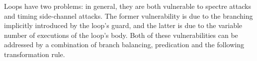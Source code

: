 Loops have two problems: in general, they are both vulnerable to spectre attacks and timing side-channel attacks. The former vulnerability is due to the branching implicitly introduced by the loop's guard, and the latter is due to the variable number of executions of the loop's body. Both of these vulnerabilities can be addressed by a combination of branch balancing, predication and the following transformation rule.
